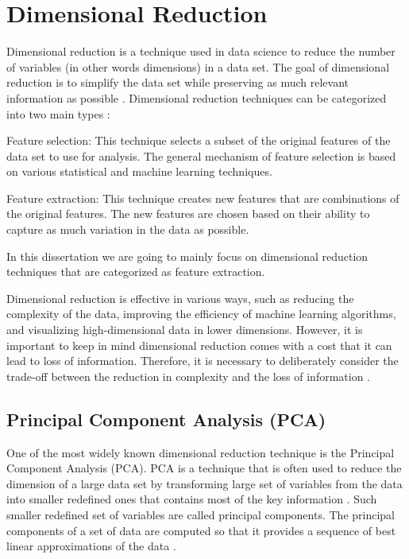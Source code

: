 \section{Dimensional Reduction} \label{sec:formalism}


Dimensional reduction is a technique used in data science to reduce the number of variables (in other words dimensions) in a data set. The goal of dimensional reduction is to simplify the data set while preserving as much relevant information as possible \cite{Varkonyi}. Dimensional reduction techniques can be categorized into two main types \cite{categorized}:

Feature selection: This technique selects a subset of the original features of the data set to use for analysis. The general mechanism of feature selection is based on various statistical and machine learning techniques.

Feature extraction: This technique creates new features that are combinations of the original features. The new features are chosen based on their ability to capture as much variation in the data as possible. 

In this dissertation we are going to mainly focus on dimensional reduction techniques that are categorized as feature extraction.

Dimensional reduction is effective in various ways, such as reducing the complexity of the data, improving the efficiency of machine learning algorithms, and visualizing high-dimensional data in lower dimensions. However, it is important to keep in mind dimensional reduction comes with a cost that it can lead to loss of information. Therefore, it is necessary to deliberately consider the trade-off between the reduction in complexity and the loss of information \cite{Pigoli}.


\subsection{Principal Component Analysis (PCA)}


One of the most widely known dimensional reduction technique is the Principal Component Analysis (PCA). PCA is a technique that is often used to reduce the dimension of a large data set by transforming large set of variables from the data into smaller redefined ones that contains most of the key information \cite{Jaadi}. Such smaller redefined set of variables are called principal components. The principal components of a set of data are computed so that it provides a sequence of best linear approximations of the data \cite{Friedman}.

